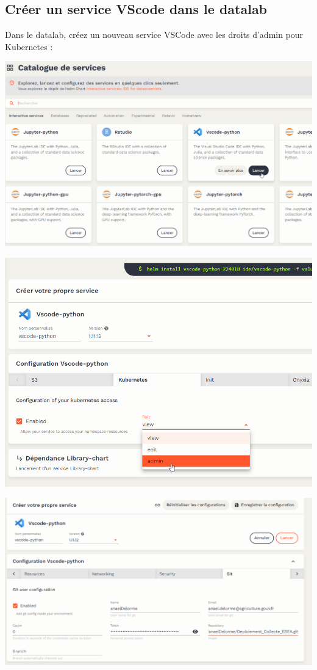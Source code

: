\documentclass[
  letterpaper,
  DIV=11,
  numbers=noendperiod]{scrreprt}
\begin{document}
\hypertarget{cruxe9er-un-service-vscode-dans-le-datalab}{%
\subsection{Créer un service VScode dans le
datalab}\label{cruxe9er-un-service-vscode-dans-le-datalab}}

Dans le datalab, créez un nouveau service VSCode avec les droits d'admin
pour Kubernetes :

\includegraphics{./images/vscode_python.png}

\includegraphics{./images/Vscode_kubernetes_admin.png}

\includegraphics{./images/vscode_deplo_git.png}
\end{document}
